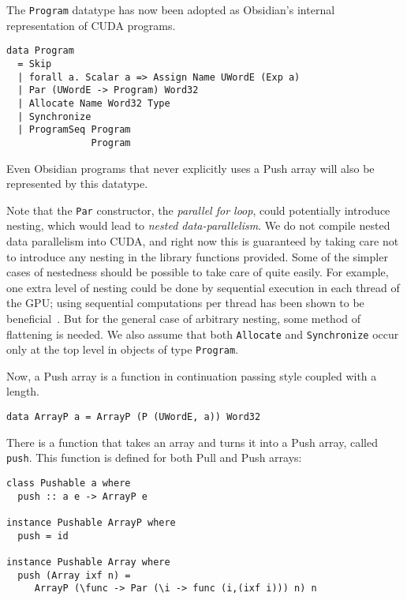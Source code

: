 The {\tt Program} datatype has now been adopted as Obsidian's internal 
representation of CUDA programs.

\begin{codesize}
\begin{verbatim}
data Program
  = Skip
  | forall a. Scalar a => Assign Name UWordE (Exp a) 
  | Par (UWordE -> Program) Word32   
  | Allocate Name Word32 Type 
  | Synchronize 
  | ProgramSeq Program 
               Program 
\end{verbatim}
\end{codesize}

\noindent
Even Obsidian programs 
that never explicitly uses a Push array will also be represented by this 
datatype. 

Note that the {\tt Par} constructor, 
the {\em parallel for loop}, could potentially introduce nesting, which would lead 
to {\em nested data-parallelism}. We do not compile nested data parallelism 
into CUDA, and right now this is guaranteed by taking care not to introduce 
any nesting in the library functions provided. Some of the 
simpler cases of nestedness should be possible to take care of quite easily. 
For example, one extra level of nesting could be done by sequential execution 
in each thread of the GPU; using sequential computations per thread has 
been shown to be beneficial~\cite{OLAMARCUS}. But for the general case 
of arbitrary nesting, some method of flattening is needed. 
We also assume that both {\tt Allocate} and {\tt Synchronize} occur only at the top level in objects of type {\tt Program}. 

Now, a Push array is a function in continuation passing style
coupled with a length. 

\begin{codesize}
\begin{verbatim}
data ArrayP a = ArrayP (P (UWordE, a)) Word32
\end{verbatim}
\end{codesize}


There is a function that takes an array and turns it into a Push array, 
called {\tt push}. This function is defined for both Pull and Push arrays: 

\begin{codesize}
\begin{verbatim} 
class Pushable a where 
  push :: a e -> ArrayP e 

instance Pushable ArrayP where 
  push = id 
  
instance Pushable Array where   
  push (Array ixf n) =
     ArrayP (\func -> Par (\i -> func (i,(ixf i))) n) n 
\end{verbatim}
\end{codesize}

